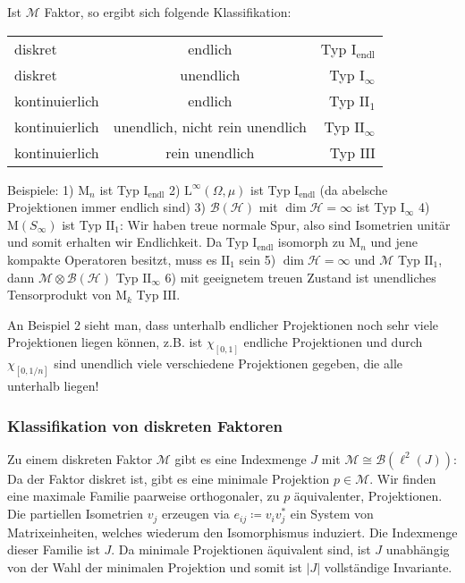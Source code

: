 \documentclass[11pt,a4paper]{scrartcl}
\newcommand{\Hc}{\mathcal{H}}
\newcommand{\B}{\mathcal{B}}
\newcommand{\M}{\mathcal{M}}
\newcommand{\Ifin}{\mathrm{I}_\mathrm{endl}}
\newcommand{\Iinf}{\mathrm{I}_\infty}
\newcommand{\IIfin}{\mathrm{II}_1}
\newcommand{\IIinf}{\mathrm{II}_\infty}
\newcommand{\III}{\mathrm{III}}
\theoremstyle{plain}
\theoremstyle{definition}
\theoremstyle{remark}
\begin{document}
Ist $\M$ Faktor, so ergibt sich folgende Klassifikation:

\begin{table}[h]
    \centering
    \begin{tabular}{l|c||r}
        diskret & endlich & Typ $\Ifin$ \\
        diskret & unendlich & Typ $\Iinf$ \\
        \hline
        kontinuierlich & endlich & Typ $\IIfin$ \\
        kontinuierlich & unendlich, nicht rein unendlich & Typ $\IIinf$ \\
        \hline
        kontinuierlich & rein unendlich & Typ $\III$
    \end{tabular}
\end{table}

Beispiele: 1) $\mathrm{M}_n$ ist Typ $\Ifin$ 2) $\mathrm{L}^\infty(\Omega, \mu)$ ist Typ $\Ifin$ (da abelsche Projektionen immer endlich sind) 3) $\B(\Hc)$ mit $\dim \Hc = \infty$ ist Typ $\Iinf$ 4) $\mathrm{M}(S_\infty)$ ist Typ $\IIfin$: Wir haben treue normale Spur, also sind Isometrien unitär und somit erhalten wir Endlichkeit. Da Typ $\Ifin$ isomorph zu $\mathrm{M}_n$ und jene kompakte Operatoren besitzt, muss es $\IIfin$ sein 5) $\dim \Hc = \infty$ und $\M$ Typ $\IIfin$, dann $\M \otimes \B(\Hc)$ Typ $\IIinf$ 6) mit geeignetem treuen Zustand ist unendliches Tensorprodukt von $\mathrm{M}_k$ Typ $\III$.

An Beispiel 2 sieht man, dass unterhalb endlicher Projektionen noch sehr viele Projektionen liegen können, z.B. ist $\chi_{[0,1]}$ endliche Projektionen und durch $\chi_{[0,1/n]}$ sind unendlich viele verschiedene Projektionen gegeben, die alle unterhalb liegen!

\subsubsection{Klassifikation von diskreten Faktoren}

Zu einem diskreten Faktor $\M$ gibt es eine Indexmenge $J$ mit $\M\cong \B(\ell^2(J))$: Da der Faktor diskret ist, gibt es eine minimale Projektion $p\in \M$. Wir finden eine maximale Familie paarweise orthogonaler, zu $p$ äquivalenter, Projektionen. Die partiellen Isometrien $v_j$ erzeugen via $e_{ij}\coloneqq v_iv^*_j$ ein System von Matrixeinheiten, welches wiederum den Isomorphismus induziert. Die Indexmenge dieser Familie ist $J$. Da minimale Projektionen äquivalent sind, ist $J$ unabhängig von der Wahl der minimalen Projektion und somit ist $|J|$ vollständige Invariante. 
\end{document}
